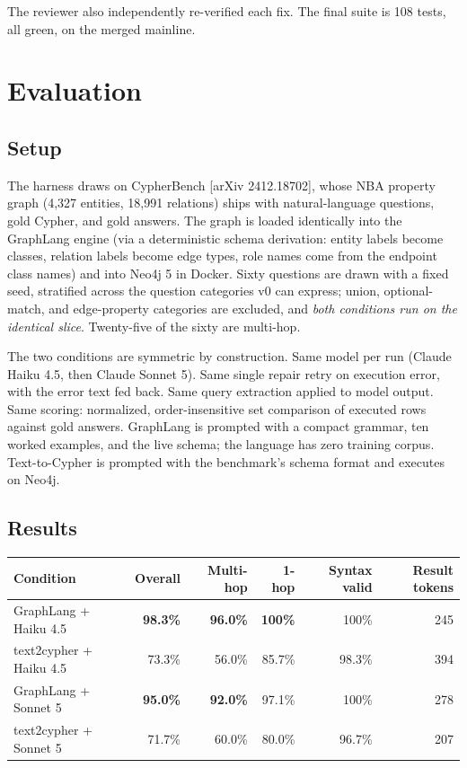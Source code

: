 \documentclass[11pt]{article}
\begin{document}
The reviewer also independently re-verified each fix. The final suite is 108 tests, all green, on the merged mainline.

\section{Evaluation}\label{sec:eval}

\subsection{Setup}

The harness draws on CypherBench [arXiv 2412.18702], whose NBA property graph (4{,}327 entities, 18{,}991 relations) ships with natural-language questions, gold Cypher, and gold answers. The graph is loaded identically into the GraphLang engine (via a deterministic schema derivation: entity labels become classes, relation labels become edge types, role names come from the endpoint class names) and into Neo4j 5 in Docker. Sixty questions are drawn with a fixed seed, stratified across the question categories v0 can express; union, optional-match, and edge-property categories are excluded, and \emph{both conditions run on the identical slice}. Twenty-five of the sixty are multi-hop.

The two conditions are symmetric by construction. Same model per run (Claude Haiku 4.5, then Claude Sonnet 5). Same single repair retry on execution error, with the error text fed back. Same query extraction applied to model output. Same scoring: normalized, order-insensitive set comparison of executed rows against gold answers. GraphLang is prompted with a compact grammar, ten worked examples, and the live schema; the language has zero training corpus. Text-to-Cypher is prompted with the benchmark's schema format and executes on Neo4j.

\subsection{Results}

\begin{center}
\begin{tabular}{lrrrrr}
\toprule
Condition & Overall & Multi-hop & 1-hop & Syntax valid & Result tokens \\
\midrule
GraphLang + Haiku 4.5 & \textbf{98.3\%} & \textbf{96.0\%} & \textbf{100\%} & 100\% & 245 \\
text2cypher + Haiku 4.5 & 73.3\% & 56.0\% & 85.7\% & 98.3\% & 394 \\
GraphLang + Sonnet 5 & \textbf{95.0\%} & \textbf{92.0\%} & 97.1\% & 100\% & 278 \\
text2cypher + Sonnet 5 & 71.7\% & 60.0\% & 80.0\% & 96.7\% & 207 \\
\bottomrule
\end{tabular}
\end{center}
\end{document}
